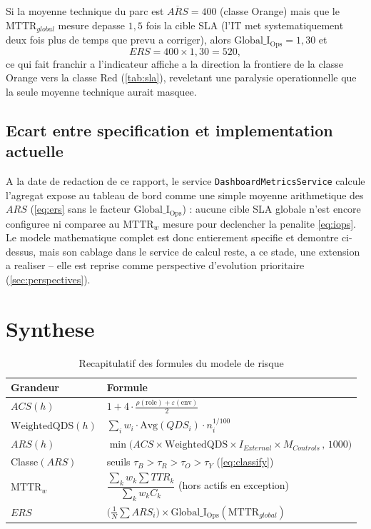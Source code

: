 \begin{exemple}
Si la moyenne technique du parc est $\overline{ARS}=400$ (classe Orange) mais que le
$\mathrm{MTTR}_{global}$ mesure depasse $1{,}5$ fois la cible SLA (l'IT met
systematiquement deux fois plus de temps que prevu a corriger), alors
$\mathrm{Global\_I_{Ops}}=1{,}30$ et
\[
ERS = 400 \times 1{,}30 = 520,
\]
ce qui fait franchir a l'indicateur affiche a la direction la frontiere de la classe
Orange vers la classe Red (\cref{tab:sla}), reveletant une paralysie operationnelle
que la seule moyenne technique aurait masquee.
\end{exemple}

\subsection{Ecart entre specification et implementation actuelle}
\label{sec:ecart-ers}

A la date de redaction de ce rapport, le service \texttt{DashboardMetricsService}
calcule l'agregat expose au tableau de bord comme une simple moyenne arithmetique
des $ARS$ (\cref{eq:ers} sans le facteur $\mathrm{Global\_I_{Ops}}$) : aucune
cible SLA globale n'est encore configuree ni comparee au $\mathrm{MTTR}_w$ mesure
pour declencher la penalite \cref{eq:iops}. Le modele mathematique complet est donc
entierement specifie et demontre ci-dessus, mais son cablage dans le service de
calcul reste, a ce stade, une extension a realiser -- elle est reprise comme
perspective d'evolution prioritaire (\cref{sec:perspectives}).

\section{Synthese}

\begin{table}[H]
\centering
\caption{Recapitulatif des formules du modele de risque}
\label{tab:synthese-formules}
\begin{tabular}{@{}p{3.1cm}p{9.4cm}@{}}
\toprule
\textbf{Grandeur} & \textbf{Formule} \\
\midrule
$ACS(h)$ & $1 + 4\cdot\frac{\rho(\mathrm{role})+\varepsilon(\mathrm{env})}{2}$ \\[4pt]
$\mathrm{WeightedQDS}(h)$ & $\sum_i w_i\cdot\mathrm{Avg}(QDS_i)\cdot n_i^{1/100}$ \\[4pt]
$ARS(h)$ & $\min\big(ACS\times\mathrm{WeightedQDS}\times I_{External}\times M_{Controls}\,,\,1000\big)$ \\[4pt]
Classe$(ARS)$ & seuils $\tau_B>\tau_R>\tau_O>\tau_Y$ (\cref{eq:classify}) \\[4pt]
$\mathrm{MTTR}_w$ & $\dfrac{\sum_k w_k\sum TTR_k}{\sum_k w_k C_k}$ (hors actifs en exception) \\[4pt]
$ERS$ & $\Big(\frac1N\sum ARS_i\Big)\times \mathrm{Global\_I_{Ops}}(\mathrm{MTTR}_{global})$ \\
\bottomrule
\end{tabular}
\end{table}
